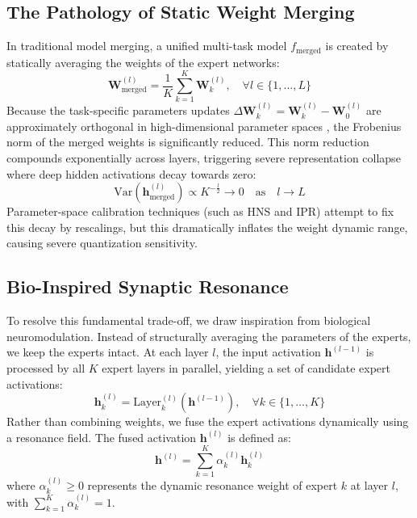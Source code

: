 \documentclass{article}
\theoremstyle{plain}
\theoremstyle{definition}
\theoremstyle{remark}
\begin{document}
\subsection{The Pathology of Static Weight Merging}
In traditional model merging, a unified multi-task model $f_{\text{merged}}$ is created by statically averaging the weights of the expert networks:
\begin{equation}
    \mathbf{W}_{\text{merged}}^{(l)} = \frac{1}{K} \sum_{k=1}^K \mathbf{W}_k^{(l)}, \quad \forall l \in \{1, \dots, L\}
\end{equation}
Because the task-specific parameters updates $\Delta \mathbf{W}_k^{(l)} = \mathbf{W}_k^{(l)} - \mathbf{W}_0^{(l)}$ are approximately orthogonal in high-dimensional parameter spaces \cite{ortizjimenez23task}, the Frobenius norm of the merged weights is significantly reduced. This norm reduction compounds exponentially across layers, triggering severe representation collapse where deep hidden activations decay towards zero:
\begin{equation}
    \text{Var}(\mathbf{h}_{\text{merged}}^{(l)}) \propto K^{-\frac{l}{2}} \to 0 \quad \text{as} \quad l \to L
\end{equation}
Parameter-space calibration techniques (such as HNS and IPR) attempt to fix this decay by rescalings, but this dramatically inflates the weight dynamic range, causing severe quantization sensitivity.

\subsection{Bio-Inspired Synaptic Resonance}
To resolve this fundamental trade-off, we draw inspiration from biological neuromodulation. Instead of structurally averaging the parameters of the experts, we keep the experts intact. At each layer $l$, the input activation $\mathbf{h}^{(l-1)}$ is processed by all $K$ expert layers in parallel, yielding a set of candidate expert activations:
\begin{equation}
    \mathbf{h}_k^{(l)} = \text{Layer}_k^{(l)}(\mathbf{h}^{(l-1)}), \quad \forall k \in \{1, \dots, K\}
\end{equation}
Rather than combining weights, we fuse the expert activations dynamically using a resonance field. The fused activation $\mathbf{h}^{(l)}$ is defined as:
\begin{equation}
    \mathbf{h}^{(l)} = \sum_{k=1}^K \alpha_k^{(l)} \mathbf{h}_k^{(l)}
\end{equation}
where $\alpha_k^{(l)} \ge 0$ represents the dynamic resonance weight of expert $k$ at layer $l$, with $\sum_{k=1}^K \alpha_k^{(l)} = 1$.
\end{document}
